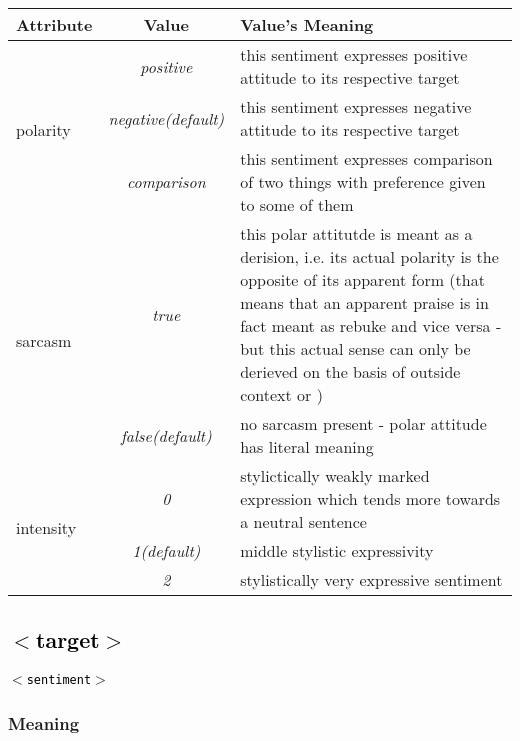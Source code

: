 \documentclass[11pt,a4paper]{article}
\newcommand{\xmltag}[1]{\textcolor{black}{{\small$<$#1$>$}}}
\begin{document}
\begin{tabular}{|l|c|p{}|}\hline
  Attribute & Value & Value's Meaning\\\hline

  \multirow{3}{*}{polarity} & \textit{positive} & this sentiment
  expresses positive attitude to its respective target\\\cline{2-3}

  & \textit{negative\newline(default)} & this sentiment
  expresses negative attitude to its respective target\\\cline{2-3}

  & \textit{comparison} & this sentiment expresses comparison of two
  things with preference given to some of them\\\hline


  \multirow{2}{*}{sarcasm} & \textit{true} & this polar attitutde is
  meant as a derision, i.e. its actual polarity is the opposite of its
  apparent form (that means that an apparent praise is in fact meant
  as rebuke and vice versa - but this actual sense can only be
  derieved on the basis of outside context or )\\\cline{2-3}

  & \textit{false\newline(default)} & no sarcasm present - polar
  attitude has literal meaning\\\hline

  \multirow{3}{*}{intensity} & \textit{0} & stylictically weakly
  marked expression which tends more towards a neutral
  sentence\\\cline{2-3}

  & \textit{1\newline(default)} & middle stylistic
  expressivity\\\cline{2-3}

  & \textit{2} & stylistically very expressive sentiment\\\hline
\end{tabular}

\subsection{\xmltag{target}}
\texttt{\xmltag{sentiment}}

\subsubsection{Meaning}
\end{document}
